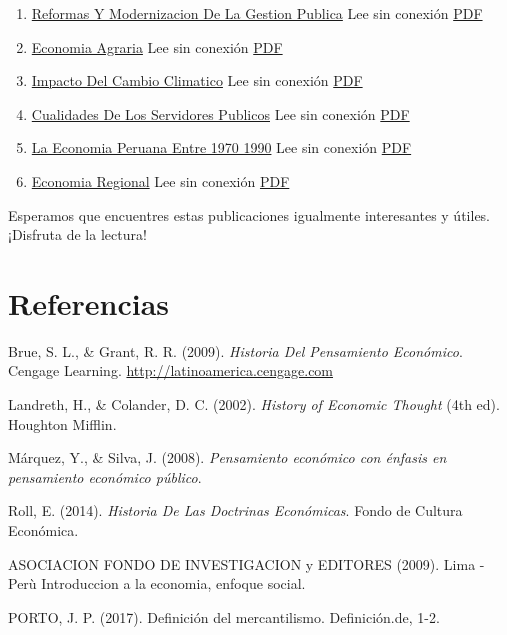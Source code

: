 \documentclass[
  jou,
  floatsintext,
  longtable,
  a4paper,
  nolmodern,
  notxfonts,
  notimes,
  colorlinks=true,linkcolor=blue,citecolor=blue,urlcolor=blue]{apa7}
\newlength{\cslhangindent}
\newenvironment{CSLReferences}[2] %
 {\begin{list}{}{%
  \setlength{\itemindent}{0pt}
  \setlength{\leftmargin}{0pt}
  \setlength{\parsep}{0pt}
  \ifodd #1
   \setlength{\leftmargin}{\cslhangindent}
   \setlength{\itemindent}{-1\cslhangindent}
  \fi
  \setlength{\itemsep}{#2\baselineskip}}}
 {\end{list}}
\begin{document}
\begin{enumerate}
\item
  \href{https://achalmaedison.netlify.app/blog/posts/2021-10-01-reformas-y-modernizacion-de-la-gestion-publica}{Reformas
  Y Modernizacion De La Gestion Publica} Lee sin conexión
  \href{https://achalmaedison.netlify.app/blog/posts/2021-10-01-reformas-y-modernizacion-de-la-gestion-publica/index.pdf}{PDF}
\item
  \href{https://achalmaedison.netlify.app/blog/posts/2022-04-22-economia-agraria}{Economia
  Agraria} Lee sin conexión
  \href{https://achalmaedison.netlify.app/blog/posts/2022-04-22-economia-agraria/index.pdf}{PDF}
\item
  \href{https://achalmaedison.netlify.app/blog/posts/2022-06-02-impacto-del-cambio-climatico}{Impacto
  Del Cambio Climatico} Lee sin conexión
  \href{https://achalmaedison.netlify.app/blog/posts/2022-06-02-impacto-del-cambio-climatico/index.pdf}{PDF}
\item
  \href{https://achalmaedison.netlify.app/blog/posts/2023-05-11-cualidades-de-los-servidores-publicos}{Cualidades
  De Los Servidores Publicos} Lee sin conexión
  \href{https://achalmaedison.netlify.app/blog/posts/2023-05-11-cualidades-de-los-servidores-publicos/index.pdf}{PDF}
\item
  \href{https://achalmaedison.netlify.app/blog/posts/2023-05-12-la-economia-peruana-entre-1970-1990}{La
  Economia Peruana Entre 1970 1990} Lee sin conexión
  \href{https://achalmaedison.netlify.app/blog/posts/2023-05-12-la-economia-peruana-entre-1970-1990/index.pdf}{PDF}
\item
  \href{https://achalmaedison.netlify.app/blog/posts/2023-05-16-economia-regional}{Economia
  Regional} Lee sin conexión
  \href{https://achalmaedison.netlify.app/blog/posts/2023-05-16-economia-regional/index.pdf}{PDF}
\end{enumerate}

Esperamos que encuentres estas publicaciones igualmente interesantes y
útiles. ¡Disfruta de la lectura!

\section{Referencias}\label{referencias}

\label{refs}
\begin{CSLReferences}{1}{0}
Brue, S. L., \& Grant, R. R. (2009). \emph{Historia {Del Pensamiento
Económico}}. Cengage Learning. \url{http://latinoamerica.cengage.com}

Landreth, H., \& Colander, D. C. (2002). \emph{History of Economic
Thought} (4th ed). Houghton Mifflin.

Márquez, Y., \& Silva, J. (2008). \emph{‪Pensamiento económico con
énfasis en pensamiento económico público‬}.

Roll, E. (2014). \emph{Historia De Las Doctrinas Económicas}. Fondo de
Cultura Económica.

\end{CSLReferences}

ASOCIACION FONDO DE INVESTIGACION y EDITORES (2009). Lima - Perù
\hspace{0pt}Introduccion a la economia, enfoque social.

PORTO, J. P. (2017). Definición del mercantilismo. Definición.de, 1-2.
\end{document}
